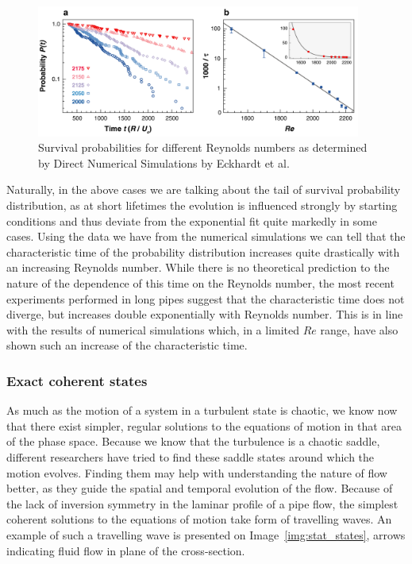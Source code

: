 \documentclass[11pt,a4paper]{article}
\begin{document}
\begin{figure}[h]
    \centering
    \includegraphics[width=0.95\textwidth]{decay_prob.png}
    \caption{Survival probabilities for different Reynolds numbers as determined by Direct Numerical Simulations by Eckhardt et al\cite{Eckhardt02}.}\label{img:decay_plot}
\end{figure}

Naturally, in the above cases we are talking about the tail of survival probability distribution, as at short lifetimes the evolution is influenced strongly by starting conditions and thus deviate from the exponential fit quite markedly in some cases.
Using the data we have from the numerical simulations we can tell that the characteristic time of the probability distribution increases quite drastically with an increasing Reynolds number.
While there is no theoretical prediction to the nature of the dependence of this time on the Reynolds number, the most recent experiments performed in long pipes suggest that the characteristic time does not diverge, but increases double exponentially with Reynolds number.
This is in line with the results of numerical simulations which, in a limited \(Re\) range, have also shown such an increase of the characteristic time.

\subsubsection{Exact coherent states}
As much as the motion of a system in a turbulent state is chaotic, we know now that there exist simpler, regular solutions to the equations of motion in that area of the phase space.
Because we know that the turbulence is a chaotic saddle, different researchers have tried to find these saddle states around which the motion evolves\cite{Clever92}\cite{Clever97}\cite{Nagata90}\cite{Faisst00}.
Finding them may help with understanding the nature of flow better, as they guide the spatial and temporal evolution of the flow.
Because of the lack of inversion symmetry in the laminar profile of a pipe flow, the simplest coherent solutions to the equations of motion take form of travelling waves.
An example of such a travelling wave is presented on Image~\ref{img:stat_states}, arrows indicating fluid flow in plane of the cross-section.
\end{document}
